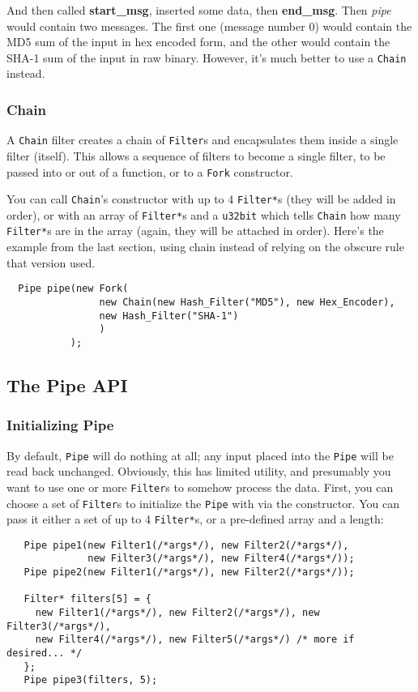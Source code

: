 \documentclass{article}
\newcommand{\function}[1]{\textbf{#1}}
\newcommand{\type}[1]{\texttt{#1}}
\renewcommand{\arg}[1]{\textsl{#1}}
\begin{document}
And then called \function{start\_msg}, inserted some data, then
\function{end\_msg}. Then \arg{pipe} would contain two messages. The
first one (message number 0) would contain the MD5 sum of the input in
hex encoded form, and the other would contain the SHA-1 sum of the
input in raw binary. However, it's much better to use a \type{Chain}
instead.

\subsubsection{Chain}

A \type{Chain} filter creates a chain of \type{Filter}s and
encapsulates them inside a single filter (itself). This allows a
sequence of filters to become a single filter, to be passed into or
out of a function, or to a \type{Fork} constructor.

You can call \type{Chain}'s constructor with up to 4 \type{Filter*}s
(they will be added in order), or with an array of \type{Filter*}s and
a \type{u32bit} which tells \type{Chain} how many \type{Filter*}s are
in the array (again, they will be attached in order). Here's the
example from the last section, using chain instead of relying on the
obscure rule that version used.

\begin{verbatim}
  Pipe pipe(new Fork(
                new Chain(new Hash_Filter("MD5"), new Hex_Encoder),
                new Hash_Filter("SHA-1")
                )
           );
\end{verbatim}

\subsection{The Pipe API}

\subsubsection{Initializing Pipe}

By default, \type{Pipe} will do nothing at all; any input placed into
the \type{Pipe} will be read back unchanged. Obviously, this has
limited utility, and presumably you want to use one or more
\type{Filter}s to somehow process the data. First, you can choose a
set of \type{Filter}s to initialize the \type{Pipe} with via the
constructor. You can pass it either a set of up to 4 \type{Filter*}s,
or a pre-defined array and a length:

\begin{verbatim}
   Pipe pipe1(new Filter1(/*args*/), new Filter2(/*args*/),
              new Filter3(/*args*/), new Filter4(/*args*/));
   Pipe pipe2(new Filter1(/*args*/), new Filter2(/*args*/));

   Filter* filters[5] = {
     new Filter1(/*args*/), new Filter2(/*args*/), new Filter3(/*args*/),
     new Filter4(/*args*/), new Filter5(/*args*/) /* more if desired... */
   };
   Pipe pipe3(filters, 5);
\end{verbatim}
\end{document}
